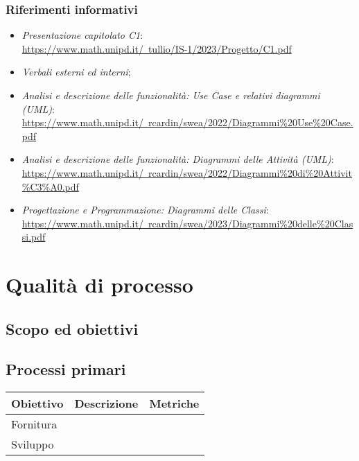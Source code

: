 \documentclass[10pt, a4paper]{article}
\begin{document}
    \subsubsection{Riferimenti informativi}
    
    \begin{itemize}
    \item \textit{Presentazione capitolato C1}:\\
    \href{https://www.math.unipd.it/~tullio/IS-1/2023/Progetto/C1.pdf}{https://www.math.unipd.it/~tullio/IS-1/2023/Progetto/C1.pdf}
    \item \textit{Verbali esterni ed interni};
    \item \textit{Analisi e descrizione delle funzionalità: Use Case e relativi diagrammi (UML)}:\\
    \href{https://www.math.unipd.it/~rcardin/swea/2022/Diagrammi%20Use%20Case.pdf}{https://www.math.unipd.it/~rcardin/swea/2022/Diagrammi\%20Use\%20Case.pdf}
    \item \textit{Analisi e descrizione delle funzionalità: Diagrammi delle Attività (UML)}:\\
    \href{https://www.math.unipd.it/~rcardin/swea/2022/Diagrammi%20di%20Attivit%C3%A0.pdf}{https://www.math.unipd.it/~rcardin/swea/2022/Diagrammi\%20di\%20Attivit\%C3\%A0.pdf}
    \item \textit{Progettazione e Programmazione: Diagrammi delle Classi}:\\
    \href{https://www.math.unipd.it/~rcardin/swea/2023/Diagrammi%20delle%20Classi.pdf}{https://www.math.unipd.it/~rcardin/swea/2023/Diagrammi\%20delle\%20Classi.pdf}
    \end{itemize}

\newpage
\section{Qualità di processo}
\subsection{Scopo ed obiettivi}

\subsection{Processi primari}
    {\renewcommand{\arraystretch}{1.5}
    \begin{tabularx}{\textwidth}{p{}|p{}|X}
    \textbf{Obiettivo} & \textbf{Descrizione} & \textbf{Metriche}  \\
    \hline
    Fornitura &  & \\
    \hline
    Sviluppo &  &  \\
    \end{tabularx}}
\end{document}
